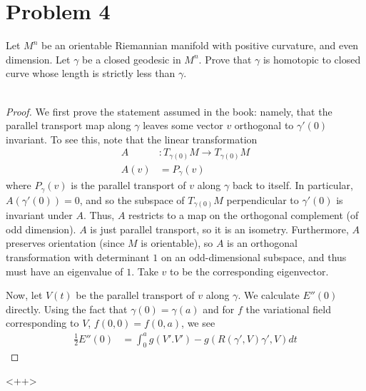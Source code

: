 \documentclass[fontsize=11pt]{scrartcl} %
\numberwithin{equation}{section} %
\numberwithin{figure}{section} %
\numberwithin{table}{section} %
\begin{document}
\newpage

\section*{Problem 4}
Let $M^n$ be an orientable Riemannian manifold with positive curvature, and even
dimension. Let $\gamma$ be a closed geodesic in $M^n$. Prove that $\gamma$ is
homotopic to closed curve whose length is strictly less than $\gamma$.
\\
\\
\begin{proof}
    We first prove the statement assumed in the book: namely, that the parallel
    transport map along $\gamma$ leaves some vector $v$ orthogonal to
    $\gamma'(0)$ invariant. To see this, note that the linear transformation
    \[
\begin{aligned}
    A&:T_{\gamma(0)}M\to T_{\gamma(0)}M\\
    A(v) &= P_{\gamma}(v)
\end{aligned}
    \]
    where $P_{\gamma}(v)$ is the parallel transport of $v$ along $\gamma$ back
    to itself. In particular, $A(\gamma'(0)) = 0$, and so the subspace of
    $T_{\gamma(0)}M$ perpendicular to $\gamma'(0)$ is invariant under $A$. Thus,
    $A$ restricts to a map on the orthogonal complement (of odd dimension). $A$
    is just parallel transport, so it is an isometry. Furthermore, $A$ preserves
    orientation (since $M$ is orientable), so $A$ is an orthogonal transformation
        with determinant $1$ on an odd-dimensional subspace, and thus must have
        an eigenvalue of $1$. Take $v$ to be the corresponding eigenvector.

    Now, let $V(t)$ be the parallel transport of $v$ along $\gamma$. We
    calculate $E''(0)$ directly. Using the fact that $\gamma(0)=\gamma(a)$ and
    for $f$ the variational field corresponding to $V$, $f(0,0)=f(0,a)$, we see
    \[
        \begin{aligned}
            \frac{1}{2}E''(0) &= \int_0^a g(V'.V') - g(R(\gamma',V)\gamma',V)dt
    \end{aligned}
    \]
\end{proof}<++>
\end{document}
